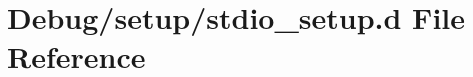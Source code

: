 \hypertarget{stdio__setup_8d}{}\section{Debug/setup/stdio\+\_\+setup.d File Reference}
\label{stdio__setup_8d}
